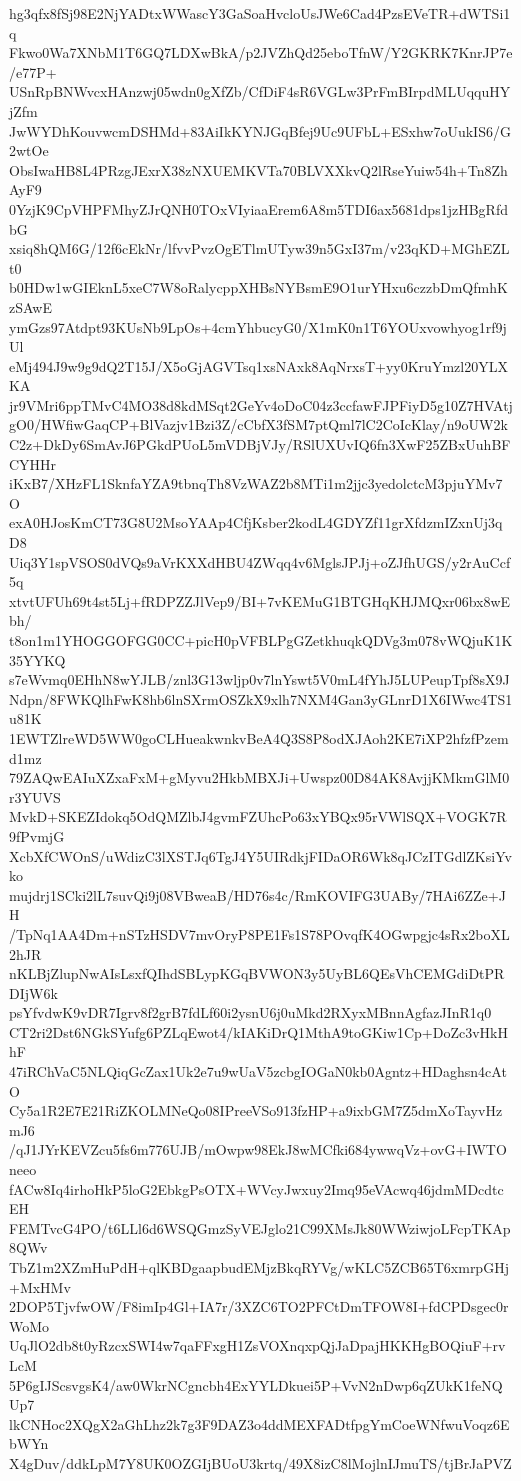 hg3qfx8fSj98E2NjYADtxWWascY3GaSoaHvcloUsJWe6Cad4PzsEVeTR+dWTSi1q
Fkwo0Wa7XNbM1T6GQ7LDXwBkA/p2JVZhQd25eboTfnW/Y2GKRK7KnrJP7e/e77P+
USnRpBNWvcxHAnzwj05wdn0gXfZb/CfDiF4sR6VGLw3PrFmBIrpdMLUqquHYjZfm
JwWYDhKouvwcmDSHMd+83AiIkKYNJGqBfej9Uc9UFbL+ESxhw7oUukIS6/G2wtOe
ObsIwaHB8L4PRzgJExrX38zNXUEMKVTa70BLVXXkvQ2lRseYuiw54h+Tn8ZhAyF9
0YzjK9CpVHPFMhyZJrQNH0TOxVIyiaaErem6A8m5TDI6ax5681dps1jzHBgRfdbG
xsiq8hQM6G/12f6cEkNr/lfvvPvzOgETlmUTyw39n5GxI37m/v23qKD+MGhEZLt0
b0HDw1wGIEknL5xeC7W8oRalycppXHBsNYBsmE9O1urYHxu6czzbDmQfmhKzSAwE
ymGzs97Atdpt93KUsNb9LpOs+4cmYhbucyG0/X1mK0n1T6YOUxvowhyog1rf9jUl
eMj494J9w9g9dQ2T15J/X5oGjAGVTsq1xsNAxk8AqNrxsT+yy0KruYmzl20YLXKA
jr9VMri6ppTMvC4MO38d8kdMSqt2GeYv4oDoC04z3ccfawFJPFiyD5g10Z7HVAtj
gO0/HWfiwGaqCP+BlVazjv1Bzi3Z/cCbfX3fSM7ptQml7lC2CoIcKlay/n9oUW2k
C2z+DkDy6SmAvJ6PGkdPUoL5mVDBjVJy/RSlUXUvIQ6fn3XwF25ZBxUuhBFCYHHr
iKxB7/XHzFL1SknfaYZA9tbnqTh8VzWAZ2b8MTi1m2jjc3yedolctcM3pjuYMv7O
exA0HJosKmCT73G8U2MsoYAAp4CfjKsber2kodL4GDYZf11grXfdzmIZxnUj3qD8
Uiq3Y1spVSOS0dVQs9aVrKXXdHBU4ZWqq4v6MglsJPJj+oZJfhUGS/y2rAuCcf5q
xtvtUFUh69t4st5Lj+fRDPZZJlVep9/BI+7vKEMuG1BTGHqKHJMQxr06bx8wEbh/
t8on1m1YHOGGOFGG0CC+picH0pVFBLPgGZetkhuqkQDVg3m078vWQjuK1K35YYKQ
s7eWvmq0EHhN8wYJLB/znl3G13wljp0v7lnYswt5V0mL4fYhJ5LUPeupTpf8sX9J
Ndpn/8FWKQlhFwK8hb6lnSXrmOSZkX9xlh7NXM4Gan3yGLnrD1X6IWwc4TS1u81K
1EWTZlreWD5WW0goCLHueakwnkvBeA4Q3S8P8odXJAoh2KE7iXP2hfzfPzemd1mz
79ZAQwEAIuXZxaFxM+gMyvu2HkbMBXJi+Uwspz00D84AK8AvjjKMkmGlM0r3YUVS
MvkD+SKEZIdokq5OdQMZlbJ4gvmFZUhcPo63xYBQx95rVWlSQX+VOGK7R9fPvmjG
XcbXfCWOnS/uWdizC3lXSTJq6TgJ4Y5UIRdkjFIDaOR6Wk8qJCzITGdlZKsiYvko
mujdrj1SCki2lL7suvQi9j08VBweaB/HD76s4c/RmKOVIFG3UABy/7HAi6ZZe+JH
/TpNq1AA4Dm+nSTzHSDV7mvOryP8PE1Fs1S78POvqfK4OGwpgjc4sRx2boXL2hJR
nKLBjZlupNwAIsLsxfQIhdSBLypKGqBVWON3y5UyBL6QEsVhCEMGdiDtPRDIjW6k
psYfvdwK9vDR7Igrv8f2grB7fdLf60i2ysnU6j0uMkd2RXyxMBnnAgfazJInR1q0
CT2ri2Dst6NGkSYufg6PZLqEwot4/kIAKiDrQ1MthA9toGKiw1Cp+DoZc3vHkHhF
47iRChVaC5NLQiqGcZax1Uk2e7u9wUaV5zcbgIOGaN0kb0Agntz+HDaghsn4cAtO
Cy5a1R2E7E21RiZKOLMNeQo08IPreeVSo913fzHP+a9ixbGM7Z5dmXoTayvHzmJ6
/qJ1JYrKEVZcu5fs6m776UJB/mOwpw98EkJ8wMCfki684ywwqVz+ovG+IWTOneeo
fACw8Iq4irhoHkP5loG2EbkgPsOTX+WVcyJwxuy2Imq95eVAcwq46jdmMDcdtcEH
FEMTvcG4PO/t6LLl6d6WSQGmzSyVEJglo21C99XMsJk80WWziwjoLFcpTKAp8QWv
TbZ1m2XZmHuPdH+qlKBDgaapbudEMjzBkqRYVg/wKLC5ZCB65T6xmrpGHj+MxHMv
2DOP5TjvfwOW/F8imIp4Gl+IA7r/3XZC6TO2PFCtDmTFOW8I+fdCPDsgec0rWoMo
UqJlO2db8t0yRzcxSWI4w7qaFFxgH1ZsVOXnqxpQjJaDpajHKKHgBOQiuF+rvLcM
5P6gIJScsvgsK4/aw0WkrNCgncbh4ExYYLDkuei5P+VvN2nDwp6qZUkK1feNQUp7
lkCNHoc2XQgX2aGhLhz2k7g3F9DAZ3o4ddMEXFADtfpgYmCoeWNfwuVoqz6EbWYn
X4gDuv/ddkLpM7Y8UK0OZGIjBUoU3krtq/49X8izC8lMojlnIJmuTS/tjBrJaPVZ
